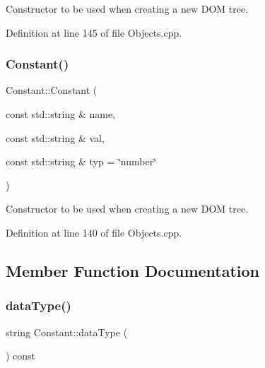 Constructor to be used when creating a new D\+OM tree. 



Definition at line 145 of file Objects.\+cpp.

\hypertarget{class_d_d4hep_1_1_geometry_1_1_constant_a0c0955ed3f56774ad3fc3fde0d1f1c35}{}\label{class_d_d4hep_1_1_geometry_1_1_constant_a0c0955ed3f56774ad3fc3fde0d1f1c35} 
\subsubsection{\texorpdfstring{Constant()}{Constant()}\hspace{0.1cm}{\footnotesize\ttfamily [5/5]}}
{\footnotesize\ttfamily Constant\+::\+Constant (\begin{DoxyParamCaption}\item[{const std\+::string \&}]{name,  }\item[{const std\+::string \&}]{val,  }\item[{const std\+::string \&}]{typ = {\ttfamily \char`\"{}number\char`\"{}} }\end{DoxyParamCaption})}



Constructor to be used when creating a new D\+OM tree. 



Definition at line 140 of file Objects.\+cpp.



\subsection{Member Function Documentation}
\hypertarget{class_d_d4hep_1_1_geometry_1_1_constant_a91d3889a9b3b330de6887c9f458b46e1}{}\label{class_d_d4hep_1_1_geometry_1_1_constant_a91d3889a9b3b330de6887c9f458b46e1} 
\subsubsection{\texorpdfstring{data\+Type()}{dataType()}}
{\footnotesize\ttfamily string Constant\+::data\+Type (\begin{DoxyParamCaption}{ }\end{DoxyParamCaption}) const}



